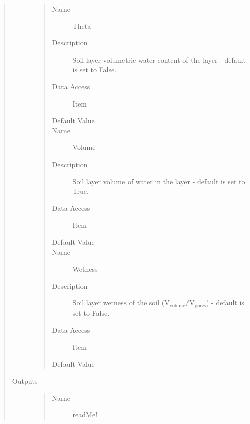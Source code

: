 \documentclass[letterpaper,10pt,english]{sphinxmanual}
\begin{document}
\begin{quote}
\begin{description}
\begin{quote}
\begin{description}
\item[{Name}] \leavevmode
Theta

\item[{Description}] \leavevmode
Soil layer volumetric water content of the layer - default is set to False.

\item[{Data Access}] \leavevmode
Item

\item[{Default Value}] \leavevmode
{}

\item[{Name}] \leavevmode
Volume

\item[{Description}] \leavevmode
Soil layer volume of water in the layer - default is set to True.

\item[{Data Access}] \leavevmode
Item

\item[{Default Value}] \leavevmode
{}

\item[{Name}] \leavevmode
Wetness

\item[{Description}] \leavevmode
Soil layer wetness of the soil (V$_{\text{volume}}$/V$_{\text{pores}}$) - default is set to False.

\item[{Data Access}] \leavevmode
Item

\item[{Default Value}] \leavevmode
{}

\end{description}\end{quote}

\item[{Outputs}] \leavevmode\begin{quote}\begin{description}
\item[{Name}] \leavevmode
readMe!


\end{description}
\end{quote}
\end{description}
\end{quote}
\end{document}

